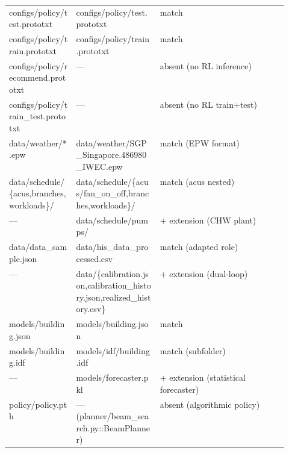 \documentclass[10pt]{article}
\begin{document}
\begin{tabularx}{\linewidth}{@{}p{0.24\linewidth} p{0.30\linewidth} X@{}}
configs/\allowbreak{}policy/\allowbreak{}test.prototxt & configs/\allowbreak{}policy/\allowbreak{}test.prototxt & match \\
configs/\allowbreak{}policy/\allowbreak{}train.prototxt & configs/\allowbreak{}policy/\allowbreak{}train.prototxt & match \\
configs/\allowbreak{}policy/\allowbreak{}recommend.prototxt & — & absent (no RL inference) \\
configs/\allowbreak{}policy/\allowbreak{}train\_\allowbreak{}test.prototxt & — & absent (no RL train+test) \\
data/\allowbreak{}weather/\allowbreak{}*.epw & data/\allowbreak{}weather/\allowbreak{}SGP\_\allowbreak{}Singapore.486980\_\allowbreak{}IWEC.epw & match (EPW format) \\
data/\allowbreak{}schedule/\allowbreak{}\{acus,branches,workloads\}/\allowbreak{} & data/\allowbreak{}schedule/\allowbreak{}\{acus/\allowbreak{}fan\_\allowbreak{}on\_\allowbreak{}off,branches,workloads\}/\allowbreak{} & match (acus nested) \\
— & data/\allowbreak{}schedule/\allowbreak{}pumps/\allowbreak{} & + extension (CHW plant) \\
data/\allowbreak{}data\_\allowbreak{}sample.json & data/\allowbreak{}his\_\allowbreak{}data\_\allowbreak{}processed.csv & match (adapted role) \\
— & data/\allowbreak{}\{calibration.json,calibration\_\allowbreak{}history.json,realized\_\allowbreak{}history.csv\} & + extension (dual-loop) \\
models/\allowbreak{}building.json & models/\allowbreak{}building.json & match \\
models/\allowbreak{}building.idf & models/\allowbreak{}idf/\allowbreak{}building.idf & match (subfolder) \\
— & models/\allowbreak{}forecaster.pkl & + extension (statistical forecaster) \\
policy/\allowbreak{}policy.pth & — (planner/\allowbreak{}beam\_\allowbreak{}search.py::BeamPlanner) & absent (algorithmic policy) \\
\bottomrule
\end{tabularx}\vspace{2pt}
\end{document}
